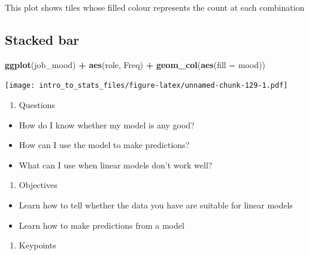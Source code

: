 \documentclass[
]{book}
\newenvironment{Shaded}{\begin{snugshade}}{\end{snugshade}}
\newcommand{\DataTypeTok}[1]{\textcolor[rgb]{0.13,0.29,0.53}{#1}}
\newcommand{\KeywordTok}[1]{\textcolor[rgb]{0.13,0.29,0.53}{\textbf{#1}}}
\newcommand{\NormalTok}[1]{#1}
\newcommand{\OperatorTok}[1]{\textcolor[rgb]{0.81,0.36,0.00}{\textbf{#1}}}
\newcommand{\StringTok}[1]{\textcolor[rgb]{0.31,0.60,0.02}{#1}}
\providecommand{\tightlist}{%
  \setlength{\itemsep}{0pt}\setlength{\parskip}{0pt}}
\begin{document}
This plot shows tiles whose filled colour represents the count at each combination

\hypertarget{stacked-bar}{%
\subsection{Stacked bar}\label{stacked-bar}}

\begin{Shaded}
\begin{Highlighting}[]
\KeywordTok{ggplot}\NormalTok{(job_mood) }\OperatorTok{+}\StringTok{ }\KeywordTok{aes}\NormalTok{(role, Freq) }\OperatorTok{+}\StringTok{ }\KeywordTok{geom_col}\NormalTok{(}\KeywordTok{aes}\NormalTok{(}\DataTypeTok{fill =}\NormalTok{ mood))}
\end{Highlighting}
\end{Shaded}

\texttt{[image: intro\_to\_stats\_files/figure-latex/unnamed-chunk-129-1.pdf]}

\begin{enumerate}
\def\labelenumi{\arabic{enumi}.}
\tightlist
\item
  Questions
\end{enumerate}

\begin{itemize}
\tightlist
\item
  How do I know whether my model is any good?
\item
  How can I use the model to make predictions?
\item
  What can I use when linear models don't work well?
\end{itemize}

\begin{enumerate}
\def\labelenumi{\arabic{enumi}.}
\setcounter{enumi}{1}
\tightlist
\item
  Objectives
\end{enumerate}

\begin{itemize}
\tightlist
\item
  Learn how to tell whether the data you have are suitable for linear models
\item
  Learn how to make predictions from a model
\end{itemize}

\begin{enumerate}
\def\labelenumi{\arabic{enumi}.}
\setcounter{enumi}{2}
\tightlist
\item
  Keypoints
\end{enumerate}
\end{document}
